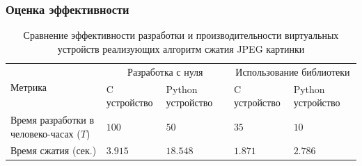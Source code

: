 \begin{frame}%
    \frametitle{Оценка эффективности}
    \small
    \begin{longtable}{| p{2cm} | p{1.5cm} | p{1.5cm} | p{1.5cm} | p{1cm} |}
        \caption{Сравнение эффективности разработки и производительности виртуальных устройств реализующих
                 алгоритм сжатия JPEG картинки} \\
        \hline
            \multirow{2}{*}{Метрика} &
            \multicolumn{2}{c|}{Разработка с нуля} &
            \multicolumn{2}{c|}{Использование библиотеки} \\
        \cline{2-5} &
            C устройство &
            Python устройство &
            C устройство &
            Python устройство \\
        \hline
            Время разработки в человеко-часах ($T$)&
            $100$ &
            $50$ &
            $35$ &
            $10$ \\
        \hline
            Время сжатия (сек.)&
            $3.915$ &
            $18.548$ &
            $1.871$ &
            $2.786$ \\
        \hline
    \end{longtable}
    \vspace*{-2.75cm}
    \begin{figure}[!htbp]
        \centering
\end{figure}
\end{frame}
